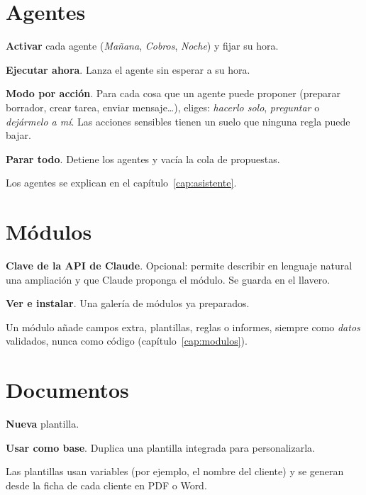 \section{Agentes}
\begin{leyenda}
\item[\mk{1}] \textbf{Activar} cada agente (\emph{Mañana}, \emph{Cobros}, \emph{Noche}) y fijar su hora.
\item[\mk{2}] \textbf{Ejecutar ahora}. Lanza el agente sin esperar a su hora.
\item[\mk{3}] \textbf{Modo por acción}. Para cada cosa que un agente puede proponer (preparar borrador, crear tarea, enviar mensaje…), eliges: \emph{hacerlo solo}, \emph{preguntar} o \emph{dejármelo a mí}. Las acciones sensibles tienen un suelo que ninguna regla puede bajar.
\item[\mk{4}] \textbf{Parar todo}. Detiene los agentes y vacía la cola de propuestas.
\end{leyenda}
Los agentes se explican en el capítulo~\ref{cap:asistente}.

\section{Módulos}
\begin{leyenda}
\item[\mk{1}] \textbf{Clave de la API de Claude}. Opcional: permite describir en lenguaje natural una ampliación y que Claude proponga el módulo. Se guarda en el llavero.
\item[\mk{2}] \textbf{Ver e instalar}. Una galería de módulos ya preparados.
\end{leyenda}
Un módulo añade campos extra, plantillas, reglas o informes, siempre como \emph{datos} validados, nunca como código (capítulo~\ref{cap:modulos}).

\section{Documentos}
\begin{leyenda}
\item[\mk{1}] \textbf{Nueva} plantilla.
\item[\mk{2}] \textbf{Usar como base}. Duplica una plantilla integrada para personalizarla.
\end{leyenda}
Las plantillas usan variables (por ejemplo, el nombre del cliente) y se generan desde la ficha de cada cliente en PDF o Word.

